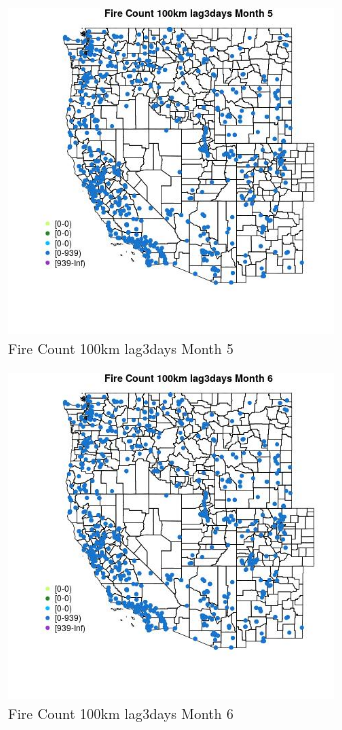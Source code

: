 \begin{figure} 
\centering  
\includegraphics[width=0.77\textwidth]{Code_Outputs/Report_ML_input_PM25_Step4_part_e_de_duplicated_aves_compiled_2019-05-21wNAs_MapObsMo5Fire_Count_100km_lag3days.jpg} 
\caption{\label{fig:Report_ML_input_PM25_Step4_part_e_de_duplicated_aves_compiled_2019-05-21wNAsMapObsMo5Fire_Count_100km_lag3days}Fire Count 100km lag3days Month 5} 
\end{figure} 
 

\begin{figure} 
\centering  
\includegraphics[width=0.77\textwidth]{Code_Outputs/Report_ML_input_PM25_Step4_part_e_de_duplicated_aves_compiled_2019-05-21wNAs_MapObsMo6Fire_Count_100km_lag3days.jpg} 
\caption{\label{fig:Report_ML_input_PM25_Step4_part_e_de_duplicated_aves_compiled_2019-05-21wNAsMapObsMo6Fire_Count_100km_lag3days}Fire Count 100km lag3days Month 6} 
\end{figure} 
 


